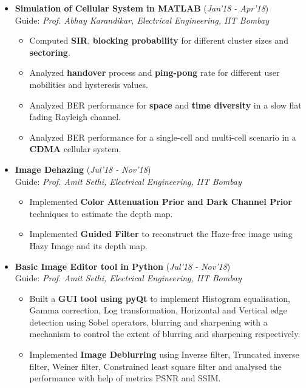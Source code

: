 \documentclass[10pt]{article}
\begin{document}
\begin{itemize}[leftmargin=0.4cm]
\item \textbf{Simulation of Cellular System in MATLAB}
\hfill{(\textit{Jan'18 - Apr'18})}\\
Guide: \textit{Prof. Abhay Karandikar, Electrical Engineering, IIT Bombay}
	\begin{itemize}
	\item Computed \textbf{SIR}, \textbf{blocking probability} for different cluster sizes and \textbf{sectoring}.
	\item Analyzed \textbf{handover} process and \textbf{ping-pong} rate for different user mobilities and hysteresis values.
	\item Analyzed BER performance for \textbf{space} and \textbf{time diversity} in a slow flat fading Rayleigh channel.
	\item Analyzed BER performance for a single-cell and multi-cell scenario in a \textbf{CDMA} cellular system.
    \end{itemize}

		
	



\item \textbf{Image Dehazing  } \hfill{(\textit{Jul'18 - Nov'18})}\\
Guide: \textit{Prof. Amit Sethi, Electrical Engineering, IIT Bombay}
	\begin{itemize}
	\item Implemented \textbf{Color Attenuation Prior and Dark Channel Prior} techniques to estimate the depth map.
	\item Implemented \textbf{Guided Filter} to reconstruct the Haze-free image using Hazy Image and its depth map.
	\end{itemize}
	

\item \textbf{Basic Image Editor tool in Python 
} 
\hfill{(\textit{Jul'18 - Nov'18})}\\
Guide: \textit{Prof. Amit Sethi, Electrical Engineering, IIT Bombay}
	\begin{itemize}
	\item Built a \textbf{GUI tool using pyQt} to implement Histogram equalisation, Gamma correction, Log transformation, Horizontal and Vertical edge detection using Sobel operators, blurring and sharpening with a mechanism to control the extent of blurring and sharpening respectively.
	\item Implemented \textbf{Image Deblurring} using Inverse filter, Truncated inverse filter, Weiner filter, Constrained least square filter and analysed the performance with help of metrics PSNR and SSIM.
	\end{itemize}



\end{itemize}
\end{document}
